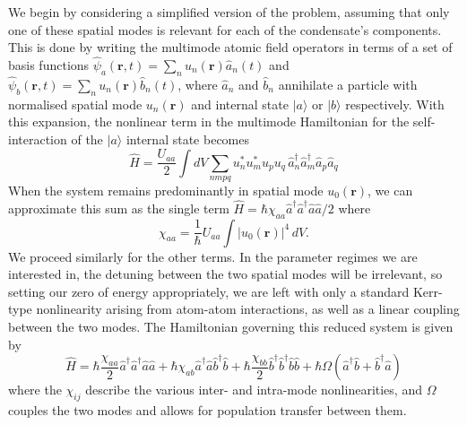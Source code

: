 \documentclass{iopart}
\begin{document}
 
We begin by considering a simplified version of the problem, assuming that only one of these spatial modes is relevant for each of the condensate's components.  This is done by writing the multimode atomic field operators in terms of a set of basis functions $\hat{\psi}_a({\mathbf{r}},t) = \sum_n u_{n}({\mathbf{r}}) \hat{a}_{n}(t)$ and $\hat{\psi}_b({\mathbf{r}},t) = \sum_n u_{n}({\mathbf{r}}) \hat{b}_{n}(t)$, where $\hat{a}_{n}$ and $\hat{b}_{n}$ annihilate a particle with normalised spatial mode $u_n({\mathbf{r}})$ and internal state $|a\rangle$ or $|b\rangle$ respectively. With this expansion, the nonlinear term in the multimode Hamiltonian for the self-interaction of the $|a\rangle$ internal state becomes
\begin{equation}
\hat{H} = \frac{U_{aa}}{2} \int dV \sum_{nmpq} u_n^* u_m^* u_p u_q \, \hat{a}^{\dagger}_{n} \hat{a}^{\dagger}_{m} \hat{a}_{p} \hat{a}_{q} 
\end{equation}
When the system remains predominantly in spatial mode $u_0(\mathbf{r})$, we can approximate this sum as the single term $\hat{H} = \hbar\chi_{aa} \hat{a}^{\dagger} \hat{a}^{\dagger} \hat{a} \hat{a}/2$ where
\begin{equation}
\chi_{aa} = \frac{1}{\hbar} U_{aa} \int |u_{0}({\mathbf{r}})|^4 \, dV.
\label{eqChiUequivalence}
\end{equation}
We proceed similarly for the other terms.  In the parameter regimes we are interested in, the detuning between the two spatial modes will be irrelevant, so setting our zero of energy appropriately, we are left with only a standard Kerr-type nonlinearity arising from atom-atom interactions, as well as a linear coupling between the two modes.  The Hamiltonian governing this reduced system is given by
\begin{equation}
\hat{H} = \hbar\frac{\chi_{aa}}{2} \hat{a}^{\dagger} \hat{a}^{\dagger} \hat{a} \hat{a}
          + \hbar\chi_{ab} \hat{a}^{\dagger} \hat{a} \hat{b}^{\dagger} \hat{b}
          + \hbar\frac{\chi_{bb}}{2} \hat{b}^{\dagger} \hat{b}^{\dagger} \hat{b} \hat{b}
          + \hbar\Omega (\hat{a}^{\dagger} \hat{b} + \hat{b}^{\dagger}  \hat{a} )
\label{eqTwoModeHamiltonian}
\end{equation}
where the $\chi_{ij}$ describe the various inter- and intra-mode nonlinearities, and $\Omega$ couples the two modes and allows for population transfer between them.
\end{document}
